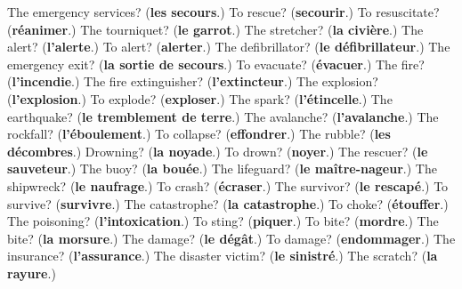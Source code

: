 \begin{tcolorbox}[breakable,colback=teal!4,colframe=teal!35!black,title={Before you move on}]
The emergency services? (\textbf{les secours}.) To rescue? (\textbf{secourir}.) To resuscitate? (\textbf{réanimer}.) The tourniquet? (\textbf{le garrot}.) The stretcher? (\textbf{la civière}.) The alert? (\textbf{l'alerte}.) To alert? (\textbf{alerter}.) The defibrillator? (\textbf{le défibrillateur}.) The emergency exit? (\textbf{la sortie de secours}.) To evacuate? (\textbf{évacuer}.) The fire? (\textbf{l'incendie}.) The fire extinguisher? (\textbf{l'extincteur}.) The explosion? (\textbf{l'explosion}.) To explode? (\textbf{exploser}.) The spark? (\textbf{l'étincelle}.) The earthquake? (\textbf{le tremblement de terre}.) The avalanche? (\textbf{l'avalanche}.) The rockfall? (\textbf{l'éboulement}.) To collapse? (\textbf{effondrer}.) The rubble? (\textbf{les décombres}.) Drowning? (\textbf{la noyade}.) To drown? (\textbf{noyer}.) The rescuer? (\textbf{le sauveteur}.) The buoy? (\textbf{la bouée}.) The lifeguard? (\textbf{le maître-nageur}.) The shipwreck? (\textbf{le naufrage}.) To crash? (\textbf{écraser}.) The survivor? (\textbf{le rescapé}.) To survive? (\textbf{survivre}.) The catastrophe? (\textbf{la catastrophe}.) To choke? (\textbf{étouffer}.) The poisoning? (\textbf{l'intoxication}.) To sting? (\textbf{piquer}.) To bite? (\textbf{mordre}.) The bite? (\textbf{la morsure}.) The damage? (\textbf{le dégât}.) To damage? (\textbf{endommager}.) The insurance? (\textbf{l'assurance}.) The disaster victim? (\textbf{le sinistré}.) The scratch? (\textbf{la rayure}.)
\end{tcolorbox}
